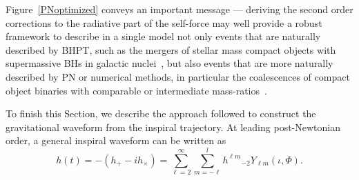 \documentclass[aps,prd,showpacs,amssymb,floatfix,nofootinbib,superscriptaddress]{revtex4-1}%
\begin{document}
Figure~\ref{PNoptimized} conveys an important message --- deriving the second order corrections to the radiative part of the self-force may well provide a robust framework to describe in a single model not only events that are naturally described by BHPT, such as the mergers of stellar mass compact objects with supermassive BHs in galactic nuclei~\cite{Huerta:2012, Huerta:2010, wargar, cutler, gairles, SFB, GairL:2013}, but also events that are more naturally described by PN or numerical methods, in particular the coalescences of compact object binaries with comparable or intermediate mass-ratios~\cite{Huerta:2012, higherspin, Huerta:2011a, Huerta:2011b, smallbody}.

To finish this Section, we describe the approach followed to construct the gravitational waveform from the inspiral trajectory. At leading post-Newtonian order, a general inspiral waveform can be written as
\begin{equation}
h(t) = -(h_{+} - i h_{\times}) = \sum_{\ell=2}^{\infty} \sum_{m=-\ell}^{l} h^{\ell m} {}_{-\!2}Y_{\ell m}(\iota,\Phi).
\label{inspwav}
\end{equation}
\end{document}

